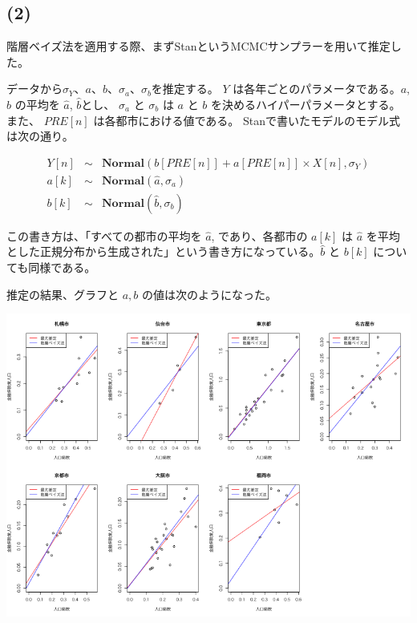 \documentclass[a4j,xelatex,ja=standard,jafont=hiragino-pron, 9pt]{bxjsarticle}
\let\origfigure=\figure
\let\endorigfigure=\endfigure
\renewenvironment{figure}[1][]{%
  \origfigure[H]
}{%
  \endorigfigure
}
\begin{document}
\subsection*{(2)}

階層ベイズ法を適用する際、まずStanというMCMCサンプラーを用いて推定した。

データから\(\sigma_Y\)、\(a\)、\(b\)、\(\sigma_a\)、\(\sigma_b\)を推定する。
\(Y\) は各年ごとのパラメータである。\(a\), \(b\) の平均を \(\hat{a}\),
\(\hat{b}\)とし、 \(\sigma_a\) と \(\sigma_b\) は \(a\) と \(b\)
を決めるハイパーパラメータとする。また、 \(PRE[n]\)
は各都市における値である。 Stanで書いたモデルのモデル式は次の通り。

\begin{eqnarray}
  Y[n] &\sim& \textbf{Normal}(b[PRE[n]] + a[PRE[n]] \times X[n], \sigma_Y) \\
  a[k] &\sim& \textbf{Normal}(\hat{a}, \sigma_a) \\
  b[k] &\sim& \textbf{Normal}(\hat{b}, \sigma_b)
\end{eqnarray}

この書き方は、「すべての都市の平均を \(\hat{a}\), であり、各都市の
\(a[k]\) は \(\hat{a}\)
を平均とした正規分布から生成された」という書き方になっている。\(\hat{b}\)
と \(b[k]\) についても同様である。

推定の結果、グラフと $a, b$ の値は次のようになった。

\begin{figure}
\centering
\includegraphics[width=15cm]{../src/output/image/mle-mcmc.png}
\caption{階層ベイズ法(ハミルトンモンテカルロ法)と最尤推定法の比較}
\end{figure}
\end{document}
